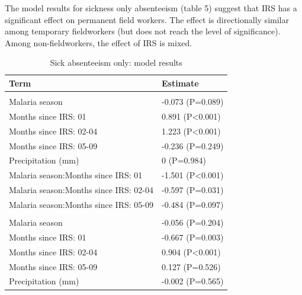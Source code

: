 \documentclass[]{article}
\begin{document}
The model results for sickness only absenteeism (table 5) suggest that
IRS has a significant effect on permanent field workers. The effect is
directionally similar among temporary fieldworkers (but does not reach
the level of significance). Among non-fieldworkers, the effect of IRS is
mixed.

\begin{table}

\caption{\label{tab:unnamed-chunk-29}Sick absenteeism only: model results}
\centering
\begin{tabular}[t]{ll}
\toprule
Term & Estimate\\
\midrule
\addlinespace[1.5em]
\multicolumn{2}{l}{\textbf{Permanent field worker}}\\
\hspace{1em}Malaria season & -0.073 (P=0.089)\\
\hspace{1em}Months since IRS: 01 & 0.891 (P<0.001)\\
\hspace{1em}Months since IRS: 02-04 & 1.223 (P<0.001)\\
\hspace{1em}Months since IRS: 05-09 & -0.236 (P=0.249)\\
\hspace{1em}Precipitation (mm) & 0 (P=0.984)\\
\hspace{1em}Malaria season:Months since IRS: 01 & -1.501 (P<0.001)\\
\hspace{1em}Malaria season:Months since IRS: 02-04 & -0.597 (P=0.031)\\
\hspace{1em}Malaria season:Months since IRS: 05-09 & -0.484 (P=0.097)\\
\addlinespace[1.5em]
\multicolumn{2}{l}{\textbf{Permanent not field worker}}\\
\hspace{1em}Malaria season & -0.056 (P=0.204)\\
\hspace{1em}Months since IRS: 01 & -0.667 (P=0.003)\\
\hspace{1em}Months since IRS: 02-04 & 0.904 (P<0.001)\\
\hspace{1em}Months since IRS: 05-09 & 0.127 (P=0.526)\\
\hspace{1em}Precipitation (mm) & -0.002 (P=0.565)\\

\end{tabular}
\end{table}
\end{document}
